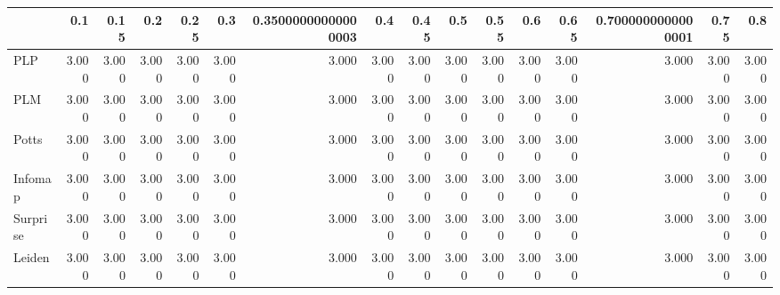 \begin{tabular}{lrrrrrrrrrrrrrrr}
\toprule
{} &   0.1 &  0.15 &   0.2 &  0.25 &   0.3 & 0.35000000000000003 &   0.4 &  0.45 &   0.5 &  0.55 &   0.6 &  0.65 & 0.7000000000000001 &  0.75 &   0.8 \\
\midrule
PLP      & 3.000 & 3.000 & 3.000 & 3.000 & 3.000 &               3.000 & 3.000 & 3.000 & 3.000 & 3.000 & 3.000 & 3.000 &              3.000 & 3.000 & 3.000 \\
PLM      & 3.000 & 3.000 & 3.000 & 3.000 & 3.000 &               3.000 & 3.000 & 3.000 & 3.000 & 3.000 & 3.000 & 3.000 &              3.000 & 3.000 & 3.000 \\
Potts    & 3.000 & 3.000 & 3.000 & 3.000 & 3.000 &               3.000 & 3.000 & 3.000 & 3.000 & 3.000 & 3.000 & 3.000 &              3.000 & 3.000 & 3.000 \\
Infomap  & 3.000 & 3.000 & 3.000 & 3.000 & 3.000 &               3.000 & 3.000 & 3.000 & 3.000 & 3.000 & 3.000 & 3.000 &              3.000 & 3.000 & 3.000 \\
Surprise & 3.000 & 3.000 & 3.000 & 3.000 & 3.000 &               3.000 & 3.000 & 3.000 & 3.000 & 3.000 & 3.000 & 3.000 &              3.000 & 3.000 & 3.000 \\
Leiden   & 3.000 & 3.000 & 3.000 & 3.000 & 3.000 &               3.000 & 3.000 & 3.000 & 3.000 & 3.000 & 3.000 & 3.000 &              3.000 & 3.000 & 3.000 \\
\bottomrule
\end{tabular}
